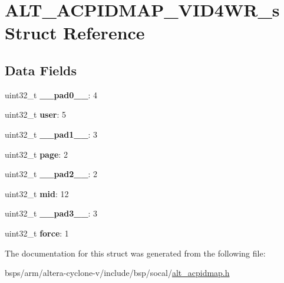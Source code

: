 \hypertarget{structALT__ACPIDMAP__VID4WR__s}{}\section{A\+L\+T\+\_\+\+A\+C\+P\+I\+D\+M\+A\+P\+\_\+\+V\+I\+D4\+W\+R\+\_\+s Struct Reference}
\label{structALT__ACPIDMAP__VID4WR__s}
\subsection*{Data Fields}
\begin{DoxyCompactItemize}
\item 
\mbox{\label{structALT__ACPIDMAP__VID4WR__s_a75448d5561e3656be3d0106852b2dca8}} 
uint32\+\_\+t {\bfseries \+\_\+\+\_\+pad0\+\_\+\+\_\+}\+: 4
\item 
\mbox{\label{structALT__ACPIDMAP__VID4WR__s_a3605c0cb1b97405850a4b13b0bffd0fd}} 
uint32\+\_\+t {\bfseries user}\+: 5
\item 
\mbox{\label{structALT__ACPIDMAP__VID4WR__s_ad6aef8d19e81368527add6f26fcb1fe6}} 
uint32\+\_\+t {\bfseries \+\_\+\+\_\+pad1\+\_\+\+\_\+}\+: 3
\item 
\mbox{\label{structALT__ACPIDMAP__VID4WR__s_abf298fbaa81351d48501e054e03aeead}} 
uint32\+\_\+t {\bfseries page}\+: 2
\item 
\mbox{\label{structALT__ACPIDMAP__VID4WR__s_ab2444212287911db9068d031fca13007}} 
uint32\+\_\+t {\bfseries \+\_\+\+\_\+pad2\+\_\+\+\_\+}\+: 2
\item 
\mbox{\label{structALT__ACPIDMAP__VID4WR__s_aa3381f61821dcc01b88cf98f8abbf13e}} 
uint32\+\_\+t {\bfseries mid}\+: 12
\item 
\mbox{\label{structALT__ACPIDMAP__VID4WR__s_a0325ae7761d5b77248749a78c93052ec}} 
uint32\+\_\+t {\bfseries \+\_\+\+\_\+pad3\+\_\+\+\_\+}\+: 3
\item 
\mbox{\label{structALT__ACPIDMAP__VID4WR__s_a955553fa371e44f6f8b41b9e110aa74a}} 
uint32\+\_\+t {\bfseries force}\+: 1
\end{DoxyCompactItemize}


The documentation for this struct was generated from the following file\+:\begin{DoxyCompactItemize}
\item 
bsps/arm/altera-\/cyclone-\/v/include/bsp/socal/\mbox{\hyperlink{alt__acpidmap_8h}{alt\+\_\+acpidmap.\+h}}\end{DoxyCompactItemize}
